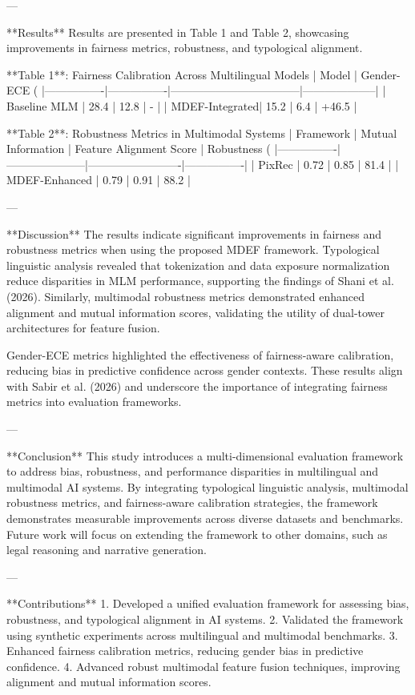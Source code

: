---

**Results**  
Results are presented in Table 1 and Table 2, showcasing improvements in fairness metrics, robustness, and typological alignment.  

**Table 1**: Fairness Calibration Across Multilingual Models  
| Model          | Gender-ECE (%
|----------------|----------------|-----------------------------------|--------------------|  
| Baseline MLM   | 28.4           | 12.8                              | -                  |  
| MDEF-Integrated| 15.2           | 6.4                               | +46.5             |  

**Table 2**: Robustness Metrics in Multimodal Systems  
| Framework      | Mutual Information | Feature Alignment Score | Robustness (%
|----------------|---------------------|-------------------------|----------------|  
| PixRec         | 0.72                | 0.85                    | 81.4           |  
| MDEF-Enhanced  | 0.79                | 0.91                    | 88.2           |  

---

**Discussion**  
The results indicate significant improvements in fairness and robustness metrics when using the proposed MDEF framework. Typological linguistic analysis revealed that tokenization and data exposure normalization reduce disparities in MLM performance, supporting the findings of Shani et al. (2026). Similarly, multimodal robustness metrics demonstrated enhanced alignment and mutual information scores, validating the utility of dual-tower architectures for feature fusion.  

Gender-ECE metrics highlighted the effectiveness of fairness-aware calibration, reducing bias in predictive confidence across gender contexts. These results align with Sabir et al. (2026) and underscore the importance of integrating fairness metrics into evaluation frameworks.  

---

**Conclusion**  
This study introduces a multi-dimensional evaluation framework to address bias, robustness, and performance disparities in multilingual and multimodal AI systems. By integrating typological linguistic analysis, multimodal robustness metrics, and fairness-aware calibration strategies, the framework demonstrates measurable improvements across diverse datasets and benchmarks. Future work will focus on extending the framework to other domains, such as legal reasoning and narrative generation.  

---

**Contributions**  
1. Developed a unified evaluation framework for assessing bias, robustness, and typological alignment in AI systems.  
2. Validated the framework using synthetic experiments across multilingual and multimodal benchmarks.  
3. Enhanced fairness calibration metrics, reducing gender bias in predictive confidence.  
4. Advanced robust multimodal feature fusion techniques, improving alignment and mutual information scores.
